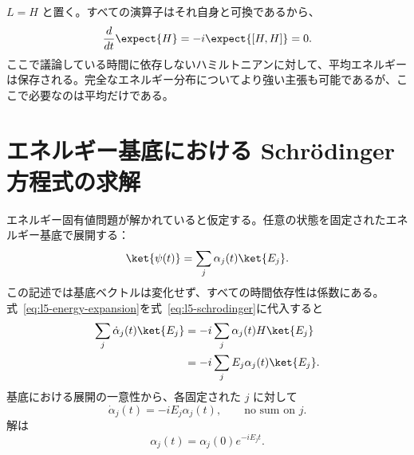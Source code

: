 \(L=H\) と置く。すべての演算子はそれ自身と可換であるから、
\begin{equation}
\frac{d}{dt}\expect{H}
=-i\expect{[H,H]}=0.
\end{equation}
ここで議論している時間に依存しないハミルトニアンに対して、平均エネルギーは保存される。完全なエネルギー分布についてより強い主張も可能であるが、ここで必要なのは平均だけである。

\begin{classroomqa}
\end{classroomqa}

\begin{classroomqa}
\end{classroomqa}

\section{エネルギー基底における Schr\"odinger 方程式の求解}

エネルギー固有値問題が解かれていると仮定する。任意の状態を固定されたエネルギー基底で展開する：
\begin{equation}
\ket{\psi(t)}=\sum_j\alpha_j(t)\ket{E_j}.
\label{eq:l5-energy-expansion}
\end{equation}
この記述では基底ベクトルは変化せず、すべての時間依存性は係数にある。式~\eqref{eq:l5-energy-expansion}を式~\eqref{eq:l5-schrodinger}に代入すると
\begin{align}
\sum_j\dot\alpha_j(t)\ket{E_j}
&=-i\sum_j\alpha_j(t)H\ket{E_j}\\
&=-i\sum_j E_j\alpha_j(t)\ket{E_j}.
\end{align}
基底における展開の一意性から、各固定された \(j\) に対して
\begin{equation}
\dot\alpha_j(t)=-iE_j\alpha_j(t),
\qquad\text{no sum on \(j\)}.
\end{equation}
解は
\begin{equation}
\alpha_j(t)=\alpha_j(0)e^{-iE_jt}.
\label{eq:l5-energy-phase}
\end{equation}

